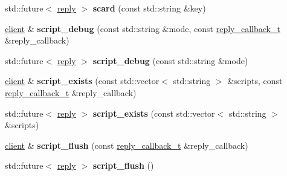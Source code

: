 \begin{DoxyCompactItemize}
std\+::future$<$ \mbox{\hyperlink{classcpp__redis_1_1reply}{reply}} $>$ {\bfseries scard} (const std\+::string \&key)
\item 
\mbox{\label{classcpp__redis_1_1client_a6e83ee14e50aef360d7246c2da63b037}} 
\mbox{\hyperlink{classcpp__redis_1_1client}{client}} \& {\bfseries script\+\_\+debug} (const std\+::string \&mode, const \mbox{\hyperlink{classcpp__redis_1_1client_af7a65eb21aa25230bfbb0b0203c4fc04}{reply\+\_\+callback\+\_\+t}} \&reply\+\_\+callback)
\item 
\mbox{\label{classcpp__redis_1_1client_a336d8dd0da70700d67bac5e71484efff}} 
std\+::future$<$ \mbox{\hyperlink{classcpp__redis_1_1reply}{reply}} $>$ {\bfseries script\+\_\+debug} (const std\+::string \&mode)
\item 
\mbox{\label{classcpp__redis_1_1client_a6fcb8af437a9ae919af745cd0a0fa313}} 
\mbox{\hyperlink{classcpp__redis_1_1client}{client}} \& {\bfseries script\+\_\+exists} (const std\+::vector$<$ std\+::string $>$ \&scripts, const \mbox{\hyperlink{classcpp__redis_1_1client_af7a65eb21aa25230bfbb0b0203c4fc04}{reply\+\_\+callback\+\_\+t}} \&reply\+\_\+callback)
\item 
\mbox{\label{classcpp__redis_1_1client_ab55eac91086b7746d731c8405f901016}} 
std\+::future$<$ \mbox{\hyperlink{classcpp__redis_1_1reply}{reply}} $>$ {\bfseries script\+\_\+exists} (const std\+::vector$<$ std\+::string $>$ \&scripts)
\item 
\mbox{\label{classcpp__redis_1_1client_a6d885c8b61bfbb74245be8d040813637}} 
\mbox{\hyperlink{classcpp__redis_1_1client}{client}} \& {\bfseries script\+\_\+flush} (const \mbox{\hyperlink{classcpp__redis_1_1client_af7a65eb21aa25230bfbb0b0203c4fc04}{reply\+\_\+callback\+\_\+t}} \&reply\+\_\+callback)
\item 
\mbox{\label{classcpp__redis_1_1client_a44f5707f8487285d69737b7857c436d7}} 
std\+::future$<$ \mbox{\hyperlink{classcpp__redis_1_1reply}{reply}} $>$ {\bfseries script\+\_\+flush} ()
\item 
\mbox{\label{classcpp__redis_1_1client_a65abffc1a1669931d5b6715f354b59af}} 

\end{DoxyCompactItemize}
